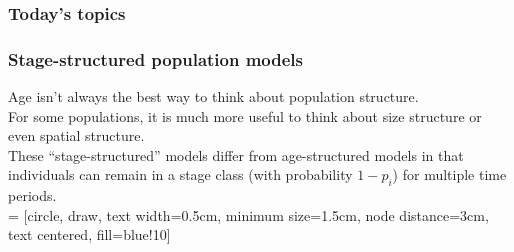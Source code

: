 \documentclass[color=usenames,dvipsnames]{beamer}\usepackage[]{graphicx}\usepackage[]{xcolor}
\begin{document}
\begin{frame}[plain]
  \frametitle{Today's topics}
  \tableofcontents[currentsection]
\end{frame}






\begin{frame}
  \frametitle{Stage-structured population models}
  \small
  Age isn't always the best way to think about population structure. \\
  \pause
  \vfill
  For some populations, it is much more useful to think about size
      structure or even spatial structure. \\
  \pause
  \vfill
  These ``stage-structured'' models differ from age-structured models
  in that individuals can remain in a stage class (with
  probability $1-p_i$) for multiple time periods. \\
   = [circle, draw, text width=0.5cm, minimum size=1.5cm,
  node distance=3cm, text centered, fill=blue!10]
  \begin{center}
  \end{center}
\end{frame}
\end{document}
